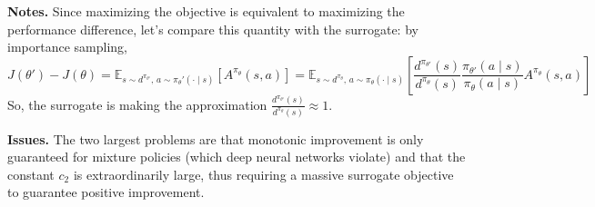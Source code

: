 \documentclass[11pt, letterpaper]{article}
\begin{document}
\begin{remark}
    \textbf{Notes.} Since maximizing the objective is equivalent to maximizing the performance difference, let's compare this quantity with the surrogate: by importance sampling, 
    \[
        J(\theta') - J(\theta)
        = \mathbb{E}_{s \sim d^{\pi_{\theta'}},\, a \sim \pi_\theta'(\cdot \mid s)} \left[ A^{\pi_\theta}(s, a) \right]
        = \mathbb{E}_{s \sim d^{\pi_\theta},\, a \sim \pi_\theta(\cdot \mid s)} \left[ \frac{d^{\pi_{\theta'}}(s)}{d^{\pi_\theta}(s)} \frac{\pi_{\theta'}(a \mid s)}{\pi_\theta(a \mid s)} A^{\pi_\theta}(s, a) \right]
    \]
    So, the surrogate is making the approximation \(\frac{d^{\pi_{\theta'}}(s)}{d^{\pi_\theta}(s)} \approx 1\). 

    \textbf{Issues.} The two largest problems are that monotonic improvement is only guaranteed for mixture policies (which deep neural networks violate) and that the constant \(c_2\) is extraordinarily large, thus requiring a massive surrogate objective to guarantee positive improvement. 
\end{remark}
\end{document}
